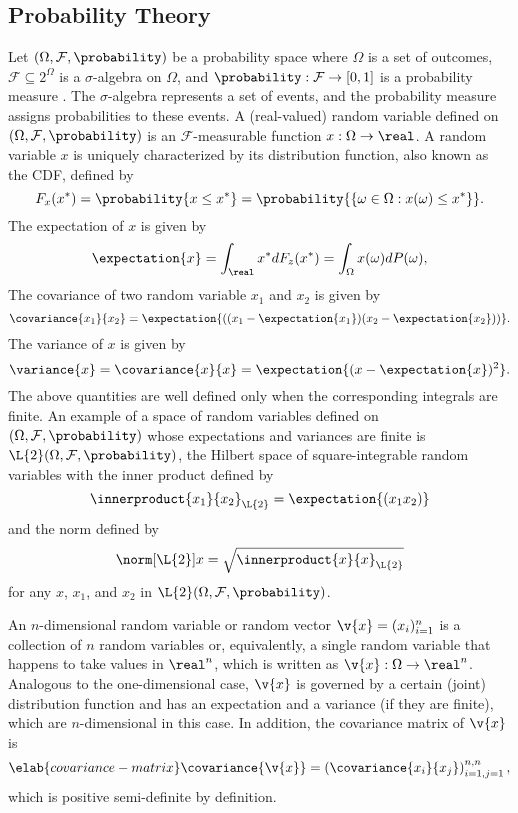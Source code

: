 \subsection{Probability Theory}

Let $(\Omega, \mathcal{F}, \probability)$ be a probability space where $\Omega$
is a set of outcomes, $\mathcal{F} \subseteq 2^\Omega$ is a $\sigma$-algebra on
$\Omega$, and $\probability: \mathcal{F} \to [0, 1]$ is a probability measure
\cite{durrett2010}. The $\sigma$-algebra represents a set of events, and the
probability measure assigns probabilities to these events. A (real-valued)
random variable defined on $(\Omega, \mathcal{F}, \probability)$ is an
$\mathcal{F}$-measurable function $x: \Omega \to \real$. A random variable $x$
is uniquely characterized by its distribution function, also known as the
\ac{CDF}, defined by
\begin{equation*}
  F_x(x^*) = \probability{x \leq x^*} = \probability{\{ \omega \in \Omega: x(\omega) \leq x^* \}}.
\end{equation*}
The expectation of $x$ is given by
\[
  \expectation{x} = \int_\real x^* dF_z(x^*) = \int_\Omega x(\omega) dP(\omega),
\]
The covariance of two random variable $x_1$ and $x_2$ is given by
\[
  \covariance{x_1}{x_2} = \expectation{((x_1 - \expectation{x_1})(x_2 - \expectation{x_2}))}.
\]
The variance of $x$ is given by
\[
  \variance{x} = \covariance{x}{x} = \expectation{(x - \expectation{x})^2}.
\]
The above quantities are well defined only when the corresponding integrals are
finite. An example of a space of random variables defined on $(\Omega,
\mathcal{F}, \probability)$ whose expectations and variances are finite is
$\L{2}(\Omega, \mathcal{F}, \probability)$, the Hilbert space of
square-integrable random variables \cite{janson1997} with the inner product
defined by
\[
  \innerproduct{x_1}{x_2}_\L{2} = \expectation{(x_1 x_2)}
\]
and the norm defined by
\[
  \norm[\L{2}]{x} = \sqrt{\innerproduct{x}{x}_\L{2}}
\]
for any $x$, $x_1$, and $x_2$ in $\L{2}(\Omega, \mathcal{F}, \probability)$.

An $n$-dimensional random variable or random vector $\v{x} = (x_i)_{i = 1}^n$ is
a collection of $n$ random variables or, equivalently, a single random variable
that happens to take values in $\real^n$, which is written as $\v{x}: \Omega \to
\real^n$. Analogous to the one-dimensional case, $\v{x}$ is governed by a
certain (joint) distribution function and has an expectation and a variance (if
they are finite), which are $n$-dimensional in this case. In addition, the
covariance matrix of $\v{x}$ is
\begin{equation} \elab{covariance-matrix}
  \covariance{\v{x}} = \left(\covariance{x_i}{x_j}\right)_{i = 1, j = 1}^{n, n},
\end{equation}
which is positive semi-definite by definition.

